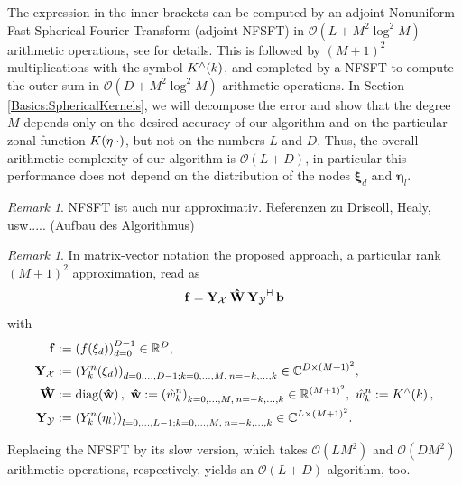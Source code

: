 \documentclass[11pt,a4paper,twoside,bibtotoc]{scrartcl}
\theoremstyle{plain}
\theoremstyle{definition}
\theoremstyle{remark}
\newtheorem{remark}[theorem]{Remark}
\newcommand{\adj}{{\vdash \hspace*{-1.72mm} \dashv}}
\newcommand{\R}{\ensuremath{\mathbb{R}}}
\newcommand{\C}{\ensuremath{\mathbb{C}}}
\newcommand{\fun}[2]{\ensuremath{#1{\hspace{-0.4ex}}\left(#2\right)}}
\newcommand{\paren}[1]{\ensuremath{\left(#1\right)}}
\newcommand{\mb}[1]{\mathbf{#1}}
\newcommand{\V}[1]{\mb{#1}}
\newcommand{\diag}{\text{\rm{diag}}}
\numberwithin{equation}{section}
\numberwithin{table}{section}
\numberwithin{figure}{section}
\begin{document}
The expression in the inner brackets can be computed by an adjoint Nonuniform
Fast Spherical Fourier Transform (adjoint NFSFT) in 
$\mathcal{O}(L + M^2 \log^2 M)$
arithmetic operations, see \cite{kupo02, keiner05} for
details.
This is followed by $(M+1)^2$ multiplications with the symbol
$\fun{K^{\wedge}}{k}$, and completed by a NFSFT to compute the outer sum in
$\mathcal{O}(D + M^2 \log^2 M)$ arithmetic operations.
In Section \ref{Basics:SphericalKernels}, we will decompose the error and show
that the degree $M$ depends only on the desired accuracy of our algorithm and
on the particular zonal function $\fun{K}{\V{\eta} \: \cdot}$, but not on the
numbers $L$ and $D$.
Thus, the overall arithmetic complexity of our algorithm is $\mathcal{O}(L +
D)$, in particular this performance does not depend on the distribution of the
nodes $\V{\xi}_{d}$ and $\V{\eta}_{l}$.

\begin{remark}
  NFSFT ist auch nur approximativ. Referenzen zu Driscoll, Healy, usw..... 
  (Aufbau des Algorithmus)
\end{remark}

\begin{remark}
In matrix-vector notation the proposed approach, a particular rank $(M+1)^2$
approximation, read as
\[
  \V{f} = \V{Y_{\mathcal{X}}} \: \V{\hat W} \:
  \V{Y_{\mathcal{Y}}}^{\adj} \: \V{b}
\]
with
\begin{align}
  \nonumber
  \V{f} & := \paren{\fun{f}{\V{\xi}_{d}}}_{d=0}^{D-1} \in \R^D,
  \\ \nonumber
  \V{Y_{\mathcal{X}}} & := \paren{\fun{Y_k^n}{\V{\xi}_{d}}}_{d=0,\ldots,D-1;
  k=0,\ldots,M,\:n=-k,\ldots,k} \in \C^{D \times
  \paren{M+1}^2}, \\ \nonumber
  \V{\hat W} & := \fun{\diag}{\V{\hat w}},\ \V{\hat w} := \paren{\hat
  w_{k}^{n}}_{k=0,\ldots,M,\:n=-k,\ldots,k} \in \R^{(M+1)^2},\ \hat w_{k}^n :=
  \fun{K^{\wedge}}{k}, \\ \nonumber
  \V{Y_{\mathcal{Y}}} & := \paren{\fun{Y_k^n}{\V{\eta}_{l}}}_{l=0,\ldots,L-1;
  k=0,\ldots,M,\:n=-k,\ldots,k} \in \C^{L \times \paren{M+1}^2}.
\end{align}

Replacing the NFSFT by its slow version, which takes $\mathcal{O}(L M^2)$ and
$\mathcal{O}(D M^2)$ arithmetic operations, respectively, yields an
$\mathcal{O}(L+D)$ algorithm, too.
\end{remark}
\end{document}
